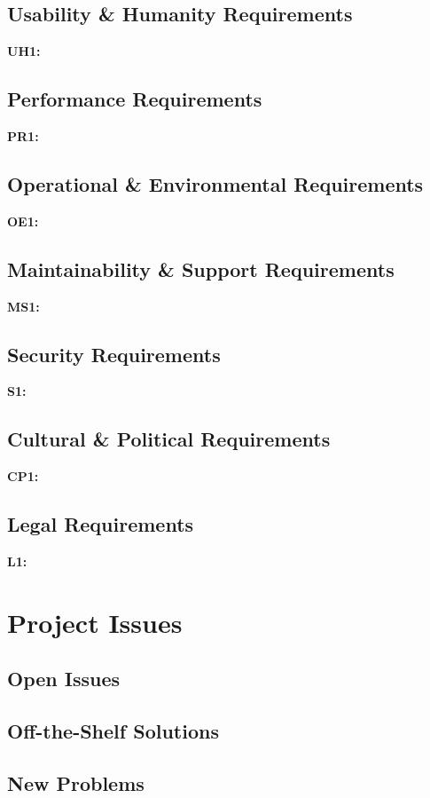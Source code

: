 \documentclass[titlepage]{article}
\begin{document}
\subsection{Usability \& Humanity Requirements}
\textbf{UH1:} %

\subsection{Performance Requirements}
\textbf{PR1:} %

\subsection{Operational \& Environmental Requirements}
\textbf{OE1:} %

\subsection{Maintainability \& Support Requirements}
\textbf{MS1:} %

\subsection{Security Requirements}
\textbf{S1:} %

\subsection{Cultural \& Political Requirements}
\textbf{CP1:} %

\subsection{Legal Requirements}
\textbf{L1:} %


\section{Project Issues}
\subsection{Open Issues}

\subsection{Off-the-Shelf Solutions}

\subsection{New Problems}
\end{document}
